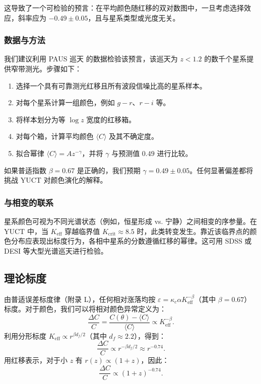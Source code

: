 \documentclass[11pt,a4paper]{article}
\newcommand{\Keff}{K_{\mathrm{eff}}}
\begin{document}
	这导致了一个可检验的预言：在平均颜色随红移的双对数图中，一旦考虑选择效应，斜率应为 \(-0.49 \pm 0.05\)，且与星系类型或光度无关。
	
	\subsubsection{数据与方法}
	
	我们建议利用 PAUS 巡天 \cite{Alarcon2019} 的数据检验该预言，该巡天为 \(z < 1.2\) 的数千个星系提供窄带测光。步骤如下：
	\begin{enumerate}
		\item 选择一个具有可靠测光红移且所有波段信噪比高的星系样本。
		\item 对每个星系计算一组颜色，例如 \(g-r\)、\(r-i\) 等。
		\item 将样本划分为等 \(\log z\) 宽度的红移箱。
		\item 对每个箱，计算平均颜色 \(\langle C \rangle\) 及其不确定度。
		\item 拟合幂律 \(\langle C \rangle = A z^{-\gamma}\)，并将 \(\gamma\) 与预测值 \(0.49\) 进行比较。
	\end{enumerate}
	
	如果普适指数 \(\beta = 0.67\) 是正确的，我们预期 \(\gamma = 0.49 \pm 0.05\)。任何显著偏差都将挑战 YUCT 对颜色演化的解释。
	
	\subsubsection{与相变的联系}
	
	星系颜色可视为不同光谱状态（例如，恒星形成 vs. 宁静）之间相变的序参量。在 YUCT 中，当 \(K_{\mathrm{eff}}\) 穿越临界值 \(K_{\mathrm{crit}} \approx 8.5\) 时，此类转变发生。靠近该临界点的颜色分布应表现出标度行为，各相中星系的分数遵循红移的幂律。这可用 SDSS 或 DESI 等大型光谱巡天进行检验。
	
	\subsection{理论标度}
	
	由普适误差标度律（附录 L），任何相对涨落均按 \(\varepsilon = \kappa_c \alpha \Keff^{-\beta}\)（其中 \(\beta = 0.67\)）标度。对于颜色，我们可以将相对颜色异常定义为：
	\begin{equation}
		\frac{\Delta C}{C} = \frac{C(\theta) - \langle C \rangle}{\langle C \rangle} \propto \Keff^{-\beta}.
	\end{equation}
	利用分形标度 \(\Keff \propto r^{\beta d_f/2}\)（其中 \(d_f \approx 2.2\)），得到：
	\begin{equation}
		\frac{\Delta C}{C} \propto r^{-\beta d_f/2} \approx r^{-0.74}.
	\end{equation}
	用红移表示，对于小 \(z\) 有 \(r(z) \propto (1+z)\)，因此：
	\begin{equation}
		\frac{\Delta C}{C} \propto (1+z)^{-0.74}.
	\end{equation}
	
\end{document}
